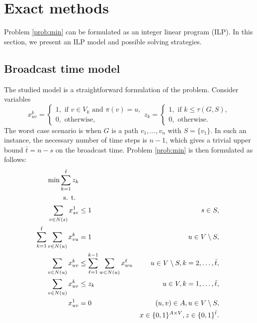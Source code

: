 \section{Exact methods} \label{sec:exact}

Problem \ref{prob:min} can be formulated as an integer linear program (ILP). %
In this section, we present an ILP model and possible solving strategies. 

\subsection{Broadcast time model}
The studied model is a straightforward formulation of the problem.
Consider variables 
$$ x_{uv}^k=
\begin{cases} 
1, \text{ if } v\in V_k \text{ and } \pi(v)=u,\\ 
0, \text{ otherwise},
\end{cases}
z_{k}=\begin{cases}
1, \text{ if } k\leq\tau(G,S),\\
0, \text{ otherwise}.
\end{cases}
$$
The worst case scenario is when $G$ is a path $v_1,\dots,v_n$ with $S=\{v_1\}$. 
In such an instance, the necessary number of time steps is $n-1$, which gives a trivial upper bound $\bar{t}=n-s$ on the broadcast time.
Problem \ref{prob:min} is then formulated as follows: 
\begin{subequations}\label{mod:basic}
\begin{align}
\label{mod:basic:obj} \min \sum\limits_{k=1}^{\bar{t}}z_k \\ 
\notag \text{s. t. } \\
\label{mod:basic:onefromroot} \sum_{v \in N(s)}x^1_{sv} & \leq 1 & s\in S,\\
\label{mod:basic:singlein} \sum\limits_{k=1}^{\bar{t}}\sum\limits_{v\in N(u)}x_{vu}^k & = 1 & u\in V \setminus S,\\
\label{mod:basic:tIncreases} \sum\limits_{v\in N(u)}x_{uv}^k &\leq\sum\limits_{\ell=1}^{k-1}\sum\limits_{w\in N(u)} x_{wu}^{\ell}  & u\in V\setminus S, k=2,\dots,\bar{t},\\
\label{mod:basic:tcrel} \sum\limits_{v\in N(u)}x_{uv}^k & \leq z_k &  u\in V,k=1,\dots,\bar{t},\\
\label{mod:basic:positiveCost}x_{uv}^1 & = 0 & (u,v)\in A, u \in V\setminus S,\\
\label{mod:basic:dim}&&x \in \{0,1\}^{A\times V},z\in\{0,1\}^{\bar{t}}.
\end{align}~
\end{subequations}

